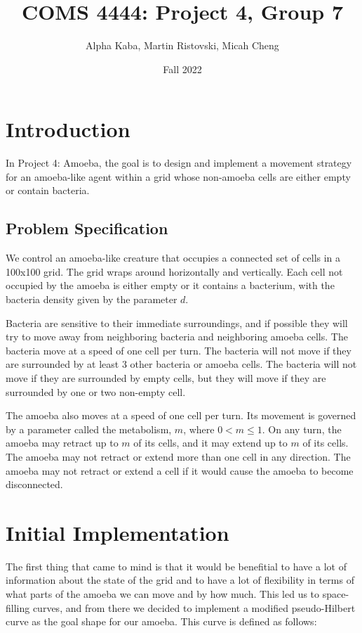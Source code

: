 \documentclass[titlepage]{article}
\title{COMS 4444: Project 4, Group 7}
\author{Alpha Kaba, Martin Ristovski, Micah Cheng}
\date{Fall 2022}
\begin{document}
\maketitle

\tableofcontents

\pagebreak

\section{Introduction}

In Project 4: Amoeba, the goal is to design and implement a movement strategy for an amoeba-like agent within a grid whose non-amoeba cells are either empty or contain bacteria.

\subsection{Problem Specification}
We control an amoeba-like creature that occupies a connected set of cells in a 100x100 grid. The grid wraps around horizontally and vertically. Each cell not occupied by the amoeba is either empty or it contains a bacterium, with the bacteria density given by the parameter $d$.

Bacteria are sensitive to their immediate surroundings, and if possible they will try to move away from neighboring bacteria and neighboring amoeba cells. The bacteria move at a speed of one cell per turn. The bacteria will not move if they are surrounded by at least 3 other bacteria or amoeba cells. The bacteria will not move if they are surrounded by empty cells, but they will move if they are surrounded by one or two non-empty cell.

The amoeba also moves at a speed of one cell per turn. Its movement is governed by a parameter called the metabolism, $m$, where $0 < m \leq 1$. On any turn, the amoeba may retract up to $m$ of its cells, and it may extend up to $m$ of its cells. The amoeba may not retract or extend more than one cell in any direction. The amoeba may not retract or extend a cell if it would cause the amoeba to become disconnected.




\section{Initial Implementation}

The first thing that came to mind is that it would be benefitial to have a lot of information about the state of the grid and to have a lot of flexibility in terms of what parts of the amoeba we can move and by how much. This led us to space-filling curves, and from there we decided to implement a modified pseudo-Hilbert curve as the goal shape for our amoeba. This curve is defined as follows:
\end{document}
